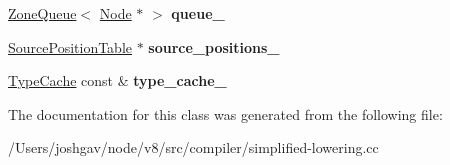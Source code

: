 \begin{DoxyCompactItemize}
\item 
\hyperlink{classv8_1_1internal_1_1_zone_queue}{Zone\+Queue}$<$ \hyperlink{classv8_1_1internal_1_1compiler_1_1_node}{Node} $\ast$ $>$ {\bfseries queue\+\_\+}\hypertarget{classv8_1_1internal_1_1compiler_1_1_representation_selector_aca19c2e799a0c2b5b20eb3d9165c76ca}{}\label{classv8_1_1internal_1_1compiler_1_1_representation_selector_aca19c2e799a0c2b5b20eb3d9165c76ca}

\item 
\hyperlink{classv8_1_1internal_1_1compiler_1_1_source_position_table}{Source\+Position\+Table} $\ast$ {\bfseries source\+\_\+positions\+\_\+}\hypertarget{classv8_1_1internal_1_1compiler_1_1_representation_selector_abed70306d3e2c951c9dc5aec5a0b627a}{}\label{classv8_1_1internal_1_1compiler_1_1_representation_selector_abed70306d3e2c951c9dc5aec5a0b627a}

\item 
\hyperlink{classv8_1_1internal_1_1_type_cache}{Type\+Cache} const \& {\bfseries type\+\_\+cache\+\_\+}\hypertarget{classv8_1_1internal_1_1compiler_1_1_representation_selector_a3b76b43c753e17a6fc89a893dfa64d07}{}\label{classv8_1_1internal_1_1compiler_1_1_representation_selector_a3b76b43c753e17a6fc89a893dfa64d07}

\end{DoxyCompactItemize}


The documentation for this class was generated from the following file\+:\begin{DoxyCompactItemize}
\item 
/\+Users/joshgav/node/v8/src/compiler/simplified-\/lowering.\+cc\end{DoxyCompactItemize}
